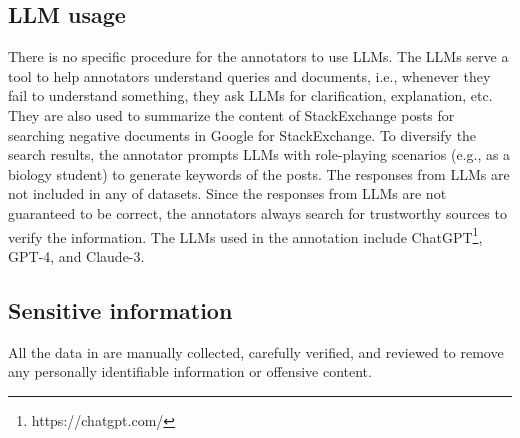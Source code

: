 

\subsection{LLM usage}
\label{app:llm_usage}
There is no specific procedure for the annotators to use LLMs. 
The LLMs serve a tool to help annotators understand queries and documents, i.e., whenever they fail to understand something, they ask LLMs for clarification, explanation, etc.
They are also used to summarize the content of StackExchange posts for searching negative documents in Google for StackExchange. 
To diversify the search results, the annotator prompts LLMs with role-playing scenarios (e.g., as a biology student) to generate keywords of the posts. 
The responses from LLMs are not included in any of \ours datasets.
Since the responses from LLMs are not guaranteed to be correct, the annotators always search for trustworthy sources to verify the information.
The LLMs used in the annotation include ChatGPT\footnote{https://chatgpt.com/}, GPT-4, and Claude-3.

\subsection{Sensitive information}
\label{app:sensitive}
All the data in \ours are manually collected, carefully verified, and reviewed to remove any personally identifiable information or offensive content.